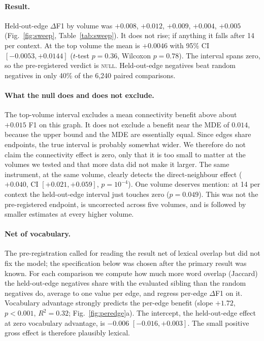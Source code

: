 \documentclass[11pt]{article}
\newcommand{\dF}{$\Delta$F1}
\begin{document}
\paragraph{Result.} Held-out-edge \dF{} by volume was $+0.008$, $+0.012$, $+0.009$, $+0.004$, $+0.005$
(Fig.~\ref{fig:sweep}, Table~\ref{tab:sweep}). It does not rise; if anything it falls after 14 per context. At
the top volume the mean is $+0.0046$ with 95\% CI $[-0.0053, +0.0144]$ ($t$-test $p=0.36$, Wilcoxon $p=0.78$).
The interval spans zero, so the pre-registered verdict is \textsc{null}. Held-out-edge negatives beat random
negatives in only 40\% of the 6,240 paired comparisons.

\paragraph{What the null does and does not exclude.} The top-volume interval excludes a mean connectivity benefit
above about $+0.015$ F1 on this graph. It does not exclude a benefit near the MDE of $0.014$, because the upper
bound and the MDE are essentially equal. Since edges share endpoints, the true interval is probably somewhat
wider. We therefore do not claim the connectivity effect is zero, only that it is too small to matter at the
volumes we tested and that more data did not make it larger. The same instrument, at the same volume, clearly
detects the direct-neighbour effect ($+0.040$, CI $[+0.021, +0.059]$, $p=10^{-4}$). One volume deserves mention:
at 14 per context the held-out-edge interval just touches zero ($p=0.049$). This was not the pre-registered
endpoint, is uncorrected across five volumes, and is followed by smaller estimates at every higher volume.

\paragraph{Net of vocabulary.} The pre-registration called for reading the result net of lexical overlap but did
not fix the model; the specification below was chosen after the primary result was known. For each comparison we
compute how much more word overlap (Jaccard) the held-out-edge negatives share with the evaluated sibling than the
random negatives do, average to one value per edge, and regress per-edge \dF{} on it. Vocabulary advantage
strongly predicts the per-edge benefit (slope $+1.72$, $p<0.001$, $R^2=0.32$; Fig.~\ref{fig:peredge}a). The
intercept, the held-out-edge effect at zero vocabulary advantage, is $-0.006$ $[-0.016, +0.003]$. The small
positive gross effect is therefore plausibly lexical.
\end{document}
